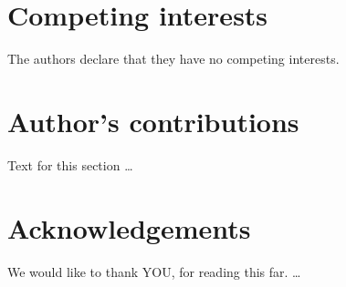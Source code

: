 \documentclass{bmcart}
\begin{document}

\begin{backmatter}

\section*{Competing interests}
  The authors declare that they have no competing interests.

\section*{Author's contributions}
    Text for this section \ldots

\section*{Acknowledgements}
  We would like to thank YOU, for reading this far.  \ldots





\end{backmatter}
\end{document}

